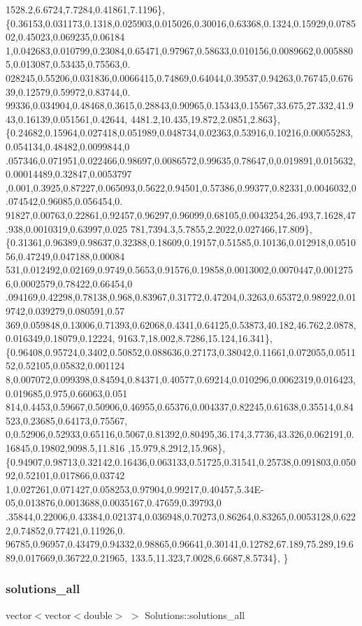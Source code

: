 \begin{DoxyCode}
      1528.2,6.6724,7.7284,0.41861,7.1196\},
\{0.36153,0.031173,0.1318,0.025903,0.015026,0.30016,0.63368,0.1324,0.15929,0.078502,0.45023,0.069235,0.06184
      1,0.042683,0.010799,0.23084,0.65471,0.97967,0.58633,0.010156,0.0089662,0.0058805,0.013087,0.53435,0.75563,0.
      028245,0.55206,0.031836,0.0066415,0.74869,0.64044,0.39537,0.94263,0.76745,0.67639,0.12579,0.59972,0.83744,0.
      99336,0.034904,0.48468,0.3615,0.28843,0.90965,0.15343,0.15567,33.675,27.332,41.943,0.16139,0.051561,0.42644,
      4481.2,10.435,19.872,2.0851,2.863\},
\{0.24682,0.15964,0.027418,0.051989,0.048734,0.02363,0.53916,0.10216,0.00055283,0.054134,0.48482,0.0099844,0
      .057346,0.071951,0.022466,0.98697,0.0086572,0.99635,0.78647,0,0.019891,0.015632,0.00014489,0.32847,0.0053797
      ,0.001,0.3925,0.87227,0.065093,0.5622,0.94501,0.57386,0.99377,0.82331,0.0046032,0.074542,0.96085,0.056454,0.
      91827,0.00763,0.22861,0.92457,0.96297,0.96099,0.68105,0.0043254,26.493,7.1628,47.938,0.0010319,0.63997,0.025
      781,7394.3,5.7855,2.2022,0.027466,17.809\},
\{0.31361,0.96389,0.98637,0.32388,0.18609,0.19157,0.51585,0.10136,0.012918,0.051056,0.47249,0.047188,0.00084
      531,0.012492,0.02169,0.9749,0.5653,0.91576,0.19858,0.0013002,0.0070447,0.0012756,0.0002579,0.78422,0.66454,0
      .094169,0.42298,0.78138,0.968,0.83967,0.31772,0.47204,0.3263,0.65372,0.98922,0.019742,0.039279,0.080591,0.57
      369,0.059848,0.13006,0.71393,0.62068,0.4341,0.64125,0.53873,40.182,46.762,2.0878,0.016349,0.18079,0.12224,
      9163.7,18.002,8.7286,15.124,16.341\},
\{0.96408,0.95724,0.3402,0.50852,0.088636,0.27173,0.38042,0.11661,0.072055,0.051152,0.52105,0.05832,0.001124
      8,0.007072,0.099398,0.84594,0.84371,0.40577,0.69214,0.010296,0.0062319,0.016423,0.019685,0.975,0.66063,0.051
      814,0.4453,0.59667,0.50906,0.46955,0.65376,0.004337,0.82245,0.61638,0.35514,0.84523,0.23685,0.64173,0.75567,
      0,0.52906,0.52933,0.65116,0.5067,0.81392,0.80495,36.174,3.7736,43.326,0.062191,0.16845,0.19802,9098.5,11.816
      ,15.979,8.2912,15.968\},
\{0.94907,0.98713,0.32142,0.16436,0.063133,0.51725,0.31541,0.25738,0.091803,0.05092,0.52101,0.017866,0.03742
      1,0.027261,0.071427,0.058253,0.97904,0.99217,0.40457,5.34E-05,0.013876,0.0013688,0.0035167,0.47659,0.39793,0
      .35844,0.22006,0.43384,0.021374,0.036948,0.70273,0.86264,0.83265,0.0053128,0.6222,0.74852,0.77421,0.11926,0.
      96785,0.96957,0.43479,0.94332,0.98865,0.96641,0.30141,0.12782,67.189,75.289,19.689,0.017669,0.36722,0.21965,
      133.5,11.323,7.0028,6.6687,8.5734\},
\}
\end{DoxyCode}
\mbox{\label{namespaceSolutions_a1d52637d01c7e17fcc05a918375a7728}} 
\subsubsection{\texorpdfstring{solutions\+\_\+all}{solutions\_all}}
{\footnotesize\ttfamily vector$<$vector$<$double$>$ $>$ Solutions\+::solutions\+\_\+all}

